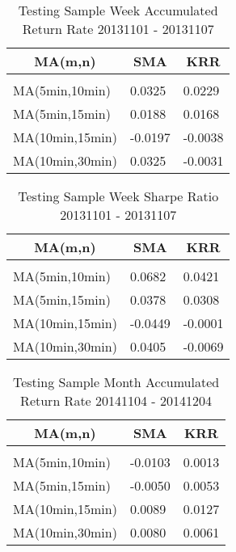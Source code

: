\documentclass{article} %
\begin{document}
\begin{table}[H]
\caption{Testing Sample Week Accumulated Return Rate 20131101 - 20131107}
\label{Table 1}
\begin{center}
\begin{tabular}{l | l l}
\multicolumn{1}{c}{\bf MA(m,n)}  &\multicolumn{1}{c}{\bf SMA} & \multicolumn{1}{c}{\bf KRR}
\\ \hline \\
MA(5min,10min) &   0.0325     & 0.0229 \\
MA(5min,15min) &   0.0188     & 0.0168 \\
MA(10min,15min) &  -0.0197    & -0.0038\\
MA(10min,30min) &   0.0325    & -0.0031\\

\end{tabular}
\end{center}
\end{table}

\begin{table}[H]
\caption{Testing Sample Week Sharpe Ratio 20131101 - 20131107}
\label{Table 2}
\begin{center}
\begin{tabular}{l | l l}
\multicolumn{1}{c}{\bf MA(m,n)}  &\multicolumn{1}{c}{\bf SMA} & \multicolumn{1}{c}{\bf KRR}
\\ \hline \\
MA(5min,10min) &   0.0682     & 0.0421 \\
MA(5min,15min) &   0.0378     & 0.0308 \\
MA(10min,15min) &  -0.0449    & -0.0001\\
MA(10min,30min) &   0.0405    & -0.0069\\

\end{tabular}
\end{center}
\end{table}

\begin{table}[H]
\caption{Testing Sample Month Accumulated Return Rate 20141104 - 20141204}
\label{Table 3}
\begin{center}
\begin{tabular}{l | l l}
\multicolumn{1}{c}{\bf MA(m,n)}  &\multicolumn{1}{c}{\bf SMA} & \multicolumn{1}{c}{\bf KRR}
\\ \hline \\
MA(5min,10min) &   -0.0103     & 0.0013 \\
MA(5min,15min) &   -0.0050     & 0.0053 \\
MA(10min,15min) &  0.0089    & 0.0127\\
MA(10min,30min) &   0.0080    & 0.0061\\

\end{tabular}
\end{center}
\end{table}
\end{document}
